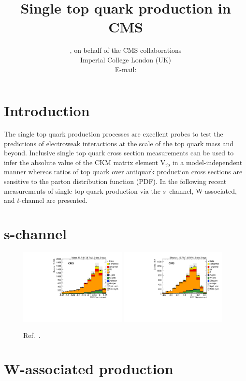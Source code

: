 \documentclass{PoS}
\title{Single top quark production in CMS}
\author{
    \speaker{Matthias Komm}, on behalf of the CMS collaborations\\
    Imperial College London (UK)\\
    E-mail: \email{Matthias.Komm@cern.ch}
}
\begin{document}
\section{Introduction}
The single top quark production processes are excellent probes to test the predictions of electroweak interactions at the scale of the top quark mass and beyond. Inclusive single top quark cross section measurements can be used to infer the absolute value of the CKM matrix element $\mathrm{V}_\mathrm{tb}$ in a model-independent manner whereas  ratios of top quark over antiquark production cross sections are sensitive to the parton distribution function (PDF). In the following recent measurements of single top quark production via the $s$~channel, W-associated, and $t$-channel are presented.

\section{s-channel}

\begin{figure}[!htb]
\begin{center}
\includegraphics[width=0.48\textwidth]{sch1.pdf}\hspace{0.02\textwidth}
\includegraphics[width=0.48\textwidth]{sch2.pdf}
\caption{\label{fig:s-channel-bdt}Ref.~\cite{sch}.}
\end{center}
\end{figure}

\section{W-associated production}
\end{document}

